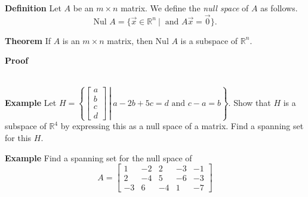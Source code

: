  \begin{frame}[fragile]
\textbf{Definition}
Let $A$ be an $m \times n$ matrix.  We define the {\em null space}
of $A$ as follows.
\[
\mbox{Nul } A = \{ \vec{x} \in \mathbb R^n \ |\  
\mbox{ and } A \vec{x} = \vec{0} \} .
\]



\textbf{Theorem}
If $A$ is an $m\times n$ matrix, then Nul $A$ is a subspace of $\mathbb R^n$.


\textbf{Proof}
\  \\
\  \\

\end{frame}






 \begin{frame}[fragile]

\textbf{Example}
Let $H = \left\{\left.  \left[ \begin{array}{rrrr} a \\ b\\ c \\ d \end{array}\right] \ \right|\  a-2b+5c = d \mbox{ and } 
c-a = b
\right\}$.  Show that $H$ is a subspace of $\mathbb R^4$ by expressing this as a null space of a matrix.  Find a spanning set for this $H$.




\textbf{Example}
Find a spanning set for the null space of 
\[
A = \left[\begin{array}{rrrrr}
1 & -2 & 2 & -3 & -1 \\   
2& -4 & 5 & -6 & -3 \\
-3 & 6 & -4 & 1 & -7 
    \end{array}\right]
\]


\end{frame}





